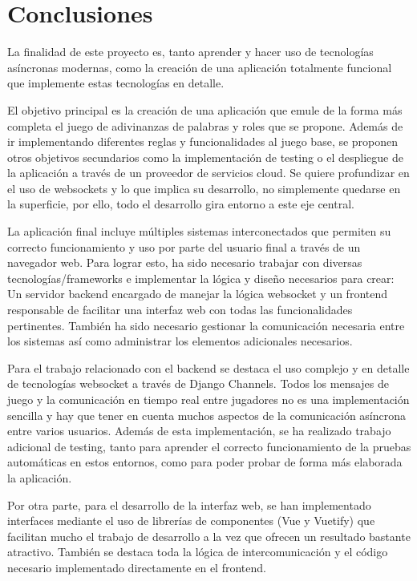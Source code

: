 \section{Conclusiones}

La finalidad de este proyecto es, tanto aprender y hacer uso de tecnologías
asíncronas modernas, como la creación de una aplicación totalmente funcional 
que implemente estas tecnologías en detalle.

El objetivo principal es la creación de una aplicación que emule de la forma más
completa el juego de adivinanzas de palabras y roles que se propone. Además de ir implementando
diferentes reglas y funcionalidades al juego base, se proponen otros objetivos secundarios
como la implementación de testing o el despliegue de la aplicación a través de un proveedor de 
servicios cloud. Se quiere profundizar en el uso de websockets y lo que implica su desarrollo, no
simplemente quedarse en la superficie, por ello, todo el desarrollo gira entorno a este eje
central. 

La aplicación final incluye múltiples sistemas interconectados que permiten su correcto
funcionamiento y uso por parte del usuario final a través de un navegador web. Para lograr esto, 
ha sido necesario trabajar con diversas tecnologías/frameworks e implementar la lógica y diseño 
necesarios para crear: Un servidor backend encargado de manejar la lógica websocket y un frontend
responsable de facilitar una interfaz web con todas las funcionalidades pertinentes. 
También ha sido necesario gestionar la comunicación necesaria entre los sistemas así como administrar
los elementos adicionales necesarios.

Para el trabajo relacionado con el backend se destaca el uso complejo y en detalle de tecnologías
websocket a través de Django Channels. Todos los mensajes de juego y la comunicación en tiempo real
entre jugadores no es una implementación sencilla y hay que tener en cuenta muchos 
aspectos de la comunicación asíncrona entre varios usuarios. Además de esta implementación,
se ha realizado trabajo adicional de testing, tanto para aprender el correcto funcionamiento 
de la pruebas automáticas en estos entornos, como para poder probar de forma más 
elaborada la aplicación.

Por otra parte, para el desarrollo de la interfaz web, se han implementado interfaces
mediante el uso de librerías de componentes (Vue y Vuetify) que facilitan mucho el trabajo de desarrollo
a la vez que ofrecen un resultado bastante atractivo. También se destaca toda la lógica de
intercomunicación y el código necesario implementado directamente en el frontend.

